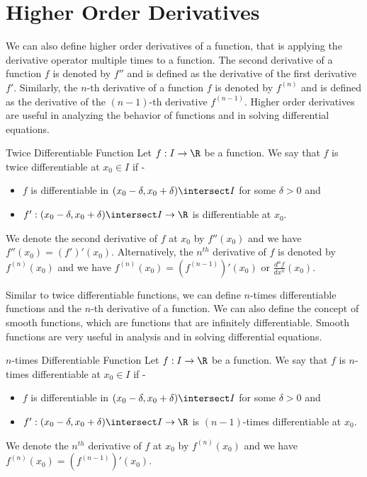 \documentclass[openany]{book}
\begin{document}
\section{Higher Order Derivatives}
We can also define higher order derivatives of a function, that is applying the derivative operator multiple times to a function. The second derivative of a function $f$ is denoted by $f''$ and is defined as the derivative of the first derivative $f'$. Similarly, the $n$-th derivative of a function $f$ is denoted by $f^{(n)}$ and is defined as the derivative of the $(n-1)$-th derivative $f^{(n-1)}$. Higher order derivatives are useful in analyzing the behavior of functions and in solving differential equations. 
\begin{mydefinition}{Twice Differentiable Function}
    Let $f: I \to \R$ be a function. We say that $f$ is twice differentiable at $x_0 \in I$ if - 
    \begin{itemize}
        \item $f$ is differentiable in $(x_0 - \delta, x_0 + \delta) \intersect I$ for some $\delta > 0$ and 
        \item $f': (x_0 - \delta, x_0 + \delta) \intersect I \to \R$ is differentiable at $x_0$.
    \end{itemize}
    We denote the second derivative of $f$ at $x_0$ by $f''(x_0)$ and we have $f''(x_0) = (f')'(x_0)$. Alternatively, the $n^{th}$ derivative of $f$ is denoted by $f^{(n)}(x_0)$ and we have $f^{(n)}(x_0) = (f^{(n-1)})'(x_0)$ or $\frac{d^n f}{dx^n}(x_0)$.
\end{mydefinition}
Similar to twice differentiable functions, we can define $n$-times differentiable functions and the $n$-th derivative of a function. We can also define the concept of smooth functions, which are functions that are infinitely differentiable. Smooth functions are very useful in analysis and in solving differential equations.
\begin{mydefinition}{$n$-times Differentiable Function}
    Let $f: I \to \R$ be a function. We say that $f$ is $n$-times differentiable at $x_0 \in I$ if - 
    \begin{itemize}
        \item $f$ is differentiable in $(x_0 - \delta, x_0 + \delta) \intersect I$ for some $\delta > 0$ and 
        \item $f': (x_0 - \delta, x_0 + \delta) \intersect I \to \R$ is $(n-1)$-times differentiable at $x_0$.
    \end{itemize}
    We denote the $n^{th}$ derivative of $f$ at $x_0$ by $f^{(n)}(x_0)$ and we have $f^{(n)}(x_0) = (f^{(n-1)})'(x_0)$. 
\end{mydefinition}
\end{document}
